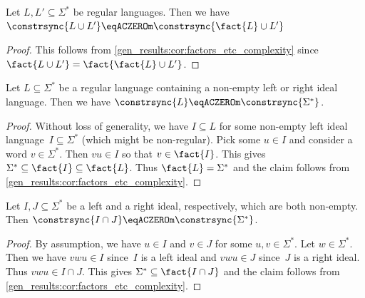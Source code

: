 \begin{corollary} \label{constrsync:genresults:cor:union-fact}
	Let $L, L' \subseteq \Sigma^*$ be regular languages.
	Then we have  $\constrsync{L \cup L'} \eqACZEROm \constrsync{\fact{L}\cup L'}$
\end{corollary}
\begin{proof}
	This follows from \cref{gen_results:cor:factors_etc_complexity}
	since $\fact{L \cup L'} = \fact{\fact{L}\cup L'}$.
\end{proof}

\begin{corollary} \label{constrsync:genresults:cor:left-right-ideal}
	Let $L \subseteq \Sigma^*$ be a regular language
	containing a non-empty left or right ideal language.
	Then we have $\constrsync{L} \eqACZEROm \constrsync{\Sigma^*}$.	
\end{corollary}
\begin{proof}
	Without loss of generality, 
	we have $I \subseteq L$
	for some non-empty left ideal language~$I \subseteq \Sigma^*$ (which might be non-regular).
	Pick some $u \in I$ and consider a word $v \in \Sigma^*$.
	Then $vu \in I$
	so that $v \in \fact{I}$.
	This gives $\Sigma^* \subseteq \fact{I} \subseteq \fact{L}$.
	Thus $\fact{L} = \Sigma^*$
	and the claim follows from \cref{gen_results:cor:factors_etc_complexity}.
\end{proof}

\begin{corollary}
	Let $I, J \subseteq \Sigma^*$ be a left and a right ideal, respectively,
	which are both non-empty.
	Then $\constrsync{I\cap J} \eqACZEROm \constrsync{\Sigma^*}$.
\end{corollary}
\begin{proof}
	By assumption, we have $u \in I$ and $v \in J$ for some $u,v \in \Sigma^*$.
	Let $w \in \Sigma^*$.
	Then we have $vwu \in I$ since~$I$ is a left ideal 
	and $vwu \in J$ since~$J$ is a right ideal.
	Thus $vwu \in I \cap J$.
	This gives $\Sigma^* \subseteq \fact{I \cap J}$
	and the claim follows from \cref{gen_results:cor:factors_etc_complexity}. 
\end{proof}